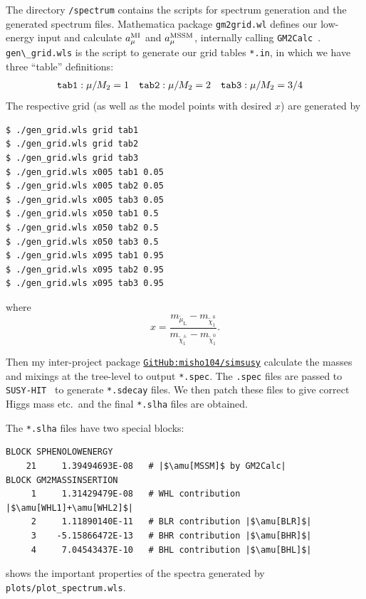 \documentclass[a4paper,10pt,captions=tableheading,DIV=14]{scrartcl}
\numberwithin{equation}{section}
\newcommand\w[1]{_{\mathrm{#1}}}
\newcommand\amu[1][\relax]{\ifx#1\relax{a_\mu}\else{a_\mu^{\mathrm{#1}}}\fi}
\newcommand\smuL{\tilde\mu\w L}
\newcommand\neut  [1][\relax]{{\tilde\chi^0_{#1}}}
\newcommand\charPM[1][\relax]{{\tilde\chi^\pm_{#1}}}
\newcommand\file[1]{\lstinline[basicstyle=\ttfamily\color{navy}]{#1}}
\newcommand\package[2][\relax]{\texttt{#2}\ifx#1\relax\relax\else~\texttt{#1}\fi}
\begin{document}
The directory \file{/spectrum} contains the scripts for spectrum generation and the generated spectrum files.
Mathematica package \file{gm2grid.wl} defines our low-energy input and calculate $\amu[MI]$ and $\amu[MSSM]$, internally calling \package{GM2Calc}.
\file{gen\_grid.wls} is the script to generate our grid tables \file{*.in}, in which we have three ``table'' definitions:
\begin{align}
 \text{\texttt{tab1}}&: \mu/M_2 = 1&
 \text{\texttt{tab2}}&: \mu/M_2 = 2&
 \text{\texttt{tab3}}&: \mu/M_2 = 3/4
\end{align}
The respective grid (as well as the model points with desired $x$) are generated by
\begin{verbatim}
$ ./gen_grid.wls grid tab1
$ ./gen_grid.wls grid tab2
$ ./gen_grid.wls grid tab3
$ ./gen_grid.wls x005 tab1 0.05
$ ./gen_grid.wls x005 tab2 0.05
$ ./gen_grid.wls x005 tab3 0.05
$ ./gen_grid.wls x050 tab1 0.5
$ ./gen_grid.wls x050 tab2 0.5
$ ./gen_grid.wls x050 tab3 0.5
$ ./gen_grid.wls x095 tab1 0.95
$ ./gen_grid.wls x095 tab2 0.95
$ ./gen_grid.wls x095 tab3 0.95
\end{verbatim}
where
\begin{equation}
 x=\frac{m_{\smuL} - m_{\neut[1]}}{m_{\charPM[1]} - m_{\neut[1]}}.
\end{equation}

Then my inter-project package \href{https://github.com/misho104/SimSUSY/tree/master/simsusy}{\texttt{GitHub:misho104/simsusy}} calculate the masses and mixings at the tree-level to output \file{*.spec}.
The \file{.spec} files are passed to \package{SUSY-HIT} to generate \file{*.sdecay} files.
We then patch these files to give correct Higgs mass etc.\ and the final \file{*.slha} files are obtained.

The \file{*.slha} files have two special blocks:
\begin{verbatim}
BLOCK SPHENOLOWENERGY
    21     1.39494693E-08   # |$\amu[MSSM]$ by GM2Calc|
BLOCK GM2MASSINSERTION
     1     1.31429479E-08   # WHL contribution |$\amu[WHL1]+\amu[WHL2]$|
     2     1.11890140E-11   # BLR contribution |$\amu[BLR]$|
     3    -5.15866472E-13   # BHR contribution |$\amu[BHR]$|
     4     7.04543437E-10   # BHL contribution |$\amu[BHL]$|
\end{verbatim}

 shows the important properties of the spectra generated by \file{plots/plot_spectrum.wls}.
\end{document}
